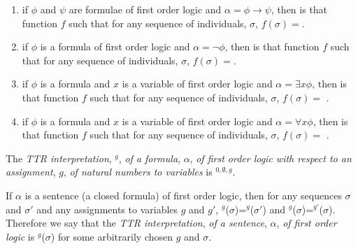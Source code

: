 \begin{enumerate}
\item \label{focl:implication} if $\phi$ and $\psi$ are formulae of first order logic and
  $\alpha=\phi\rightarrow\psi$, then \fotrans{$\alpha$} is that function
  $f$ such that for any sequence of individuals, $\sigma$,
  $f(\sigma)=$.

\item \label{focl:negation} if $\phi$ is a formula of first order logic and
  $\alpha=\neg\phi$, then \fotrans{$\alpha$} is that function
  $f$ such that for any sequence of individuals, $\sigma$, $f(\sigma)=$.

\item if $\phi$ is a formula and $x$ is a variable of first order
  logic and $\alpha=\exists x\phi$, then \fotrans{$\alpha$} is that function
  $f$ such that for any sequence of individuals, $\sigma$,
  $f(\sigma)=$
.

\item if $\phi$ is a formula and $x$ is a variable of first order
  logic and $\alpha=\forall x\phi$, then \fotrans{$\alpha$} is that function
  $f$ such that for any sequence of individuals, $\sigma$,
  $f(\sigma)=$
.


  
 
\end{enumerate}

The \textit{TTR interpretation}, \mng{$\alpha$}$^g$, \textit{of a formula}, $\alpha$, \textit{of first
order logic with respect to an assignment}, $g$, \textit{of natural numbers to
variables} is \mng{$\alpha$}$^{0,\emptyset,g}$.

If $\alpha$ is a sentence (a closed formula) of first order logic,
then for any sequences $\sigma$ and $\sigma'$ and any assignments to
variables $g$ and $g'$,
\mng{$\alpha$}$^g$($\sigma$)=\mng{$\alpha$}$^g$($\sigma'$) and
\mng{$\alpha$}$^g$($\sigma$)=\mng{$\alpha$}$^{g'}$($\sigma$). Therefore
we say that the \textit{TTR interpretation}, \mng{$\alpha$} \textit{of a sentence},
$\alpha$, \textit{of first order logic} is \mng{$\alpha$}$^g$($\sigma$) for
some arbitrarily chosen $g$ and $\sigma$.

